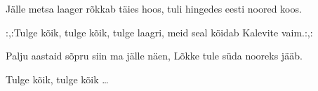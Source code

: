 J\"alle metsa laager r\~okkab t\"aies hoos,
tuli hingedes eesti noored koos.

:,:Tulge k\~oik, tulge k\~oik, tulge laagri,
meid seal k\"oidab Kalevite vaim.:,:

Palju aastaid s\~opru siin ma j\"alle n\"aen,
L\~okke tule s\"uda nooreks j\"a\"ab.

Tulge k\~oik, tulge k\~oik \ldots
